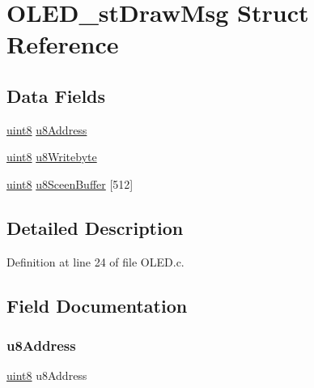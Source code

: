 \hypertarget{struct_o_l_e_d__st_draw_msg}{}\section{O\+L\+E\+D\+\_\+st\+Draw\+Msg Struct Reference}
\label{struct_o_l_e_d__st_draw_msg}
\subsection*{Data Fields}
\begin{DoxyCompactItemize}
\item 
\mbox{\hyperlink{_p_i_t_8h_adde6aaee8457bee49c2a92621fe22b79}{uint8}} \mbox{\hyperlink{struct_o_l_e_d__st_draw_msg_a932b59335d55254051885be73fae32ef}{u8\+Address}}
\item 
\mbox{\hyperlink{_p_i_t_8h_adde6aaee8457bee49c2a92621fe22b79}{uint8}} \mbox{\hyperlink{struct_o_l_e_d__st_draw_msg_a065572928972e30875485dcf81db66ef}{u8\+Writebyte}}
\item 
\mbox{\hyperlink{_p_i_t_8h_adde6aaee8457bee49c2a92621fe22b79}{uint8}} \mbox{\hyperlink{struct_o_l_e_d__st_draw_msg_af658d123a34c470b9070e5901de4bc40}{u8\+Sceen\+Buffer}} \mbox{[}512\mbox{]}
\end{DoxyCompactItemize}


\subsection{Detailed Description}


Definition at line 24 of file O\+L\+E\+D.\+c.



\subsection{Field Documentation}
\mbox{\label{struct_o_l_e_d__st_draw_msg_a932b59335d55254051885be73fae32ef}} 
\subsubsection{\texorpdfstring{u8Address}{u8Address}}
{\footnotesize\ttfamily \mbox{\hyperlink{_p_i_t_8h_adde6aaee8457bee49c2a92621fe22b79}{uint8}} u8\+Address}



